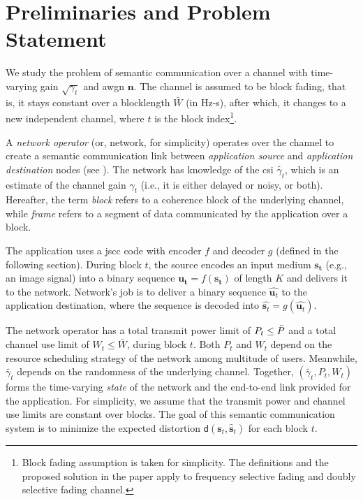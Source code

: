 

\section{Preliminaries and Problem Statement}
\label{sec:prelim}




We study the problem of semantic communication over a  channel with time-varying gain $\sqrt{\gamma_t}$ and \gls{awgn} $\mathbf{n}$. The channel is assumed to be block fading, that is, it stays constant over a  blocklength  $\bar{W}$ (in Hz-s), after which, it changes to a new independent channel, where $t$ is the block index\footnote{Block fading assumption is taken for simplicity. The definitions and the proposed solution in the paper apply  to frequency selective fading and doubly selective fading channel.}. 

A \emph{network operator} (or, network, for simplicity) operates over the channel to create a semantic communication link between  \emph{application source} and  \emph{application destination} nodes (see ). The network has knowledge of the \gls{csi} $\tilde{\gamma_t}$, which is an estimate of the channel gain ${\gamma_t}$ (i.e., it is either delayed or noisy, or both). Hereafter, the term \emph{block} refers to a coherence block of the underlying channel, while \emph{frame} refers to a segment of data communicated by the application over a block. 

The application uses a \gls{jscc} code   with   encoder $f$ and decoder $g$ (defined in the following section). 
During  block $t$, the source encodes an input medium $\mathbf{s_t}$ (e.g., an  image signal) into a binary sequence \( \mathbf{u_t} = f(\mathbf{s_t}) \) of length $K$ and delivers it to the network. Network's job is to deliver a binary sequence $\hat{\mathbf{u}_t}$ to the application destination, where the sequence is decoded into \( \hat{\mathbf{s}_t} = g(\hat{\mathbf{u}_t}) \). 

The network operator has a total transmit power limit of $P_t \leq \Bar{P}$ and a total channel use  limit of $W_t \leq \bar{W}$, during  block $t$. Both $P_t$ and $W_t$ depend on the resource scheduling strategy of the network among multitude of users. Meanwhile, $\tilde{\gamma_t}$ depends on the randomness of the underlying channel. Together, $(\tilde{\gamma_t},P_t,W_t)$ forms the time-varying \emph{state} of the network and the end-to-end link provided for the application. For simplicity, we assume that the transmit power and channel use limits are constant over blocks. The goal of this semantic communication system is to minimize the expected distortion $\mathsf{d}({\mathbf{s}_t}, \hat{\mathbf{s}}_t)$ for each block $t$.


